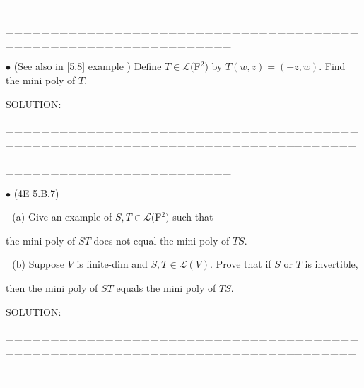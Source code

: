 \documentclass[a4paper, 11pt, UTF8]{article}
\def\Lm{\mathcal{L}}
\begin{document}
\begin{large}
\par
{\tiny \_\,\_\,\_\,\_\,\_\,\_\,\_\,\_\,\_\,\_\,\_\,\_\,\_\,\_\,\_\,\_\,\_\,\_\,\_\,\_\,\_\,\_\,\_\,\_\,\_\,\_\,\_\,\_\,\_\,\_\,\_\,\_\,\_\,\_\,\_\,\_\,\_\,\_\,\_\,\_\,\_\,\_\,\_\,\_\,\_\,\_\,\_\,\_\,\_\,\_\,\_\,\_\,\_\,\_\,\_\,\_\,\_\,\_\,\_\,\_\,\_\,\_\,\_\,\_\,\_\,\_\,\_\,\_\,\_\,\_\,\_\_\,\_\,\_\,\_\,\_\,\_\,\_\,\_\,\_\,\_\,\_\,\_\,\_\,\_\,\_\,\_\,\_\,\_\,\_\,\_\,\_\,\_\,\_\,\_\,\_\,\_\,\_\,\_\,\_\,\_\,\_\,\_\,\_\,\_\,\_\,\_\,\_\,\_\,\_\,\_\,\_\,\_\,\_\,\_\,\_\,\_\,\_\,\_\,\_\,\_\,\_\,\_\,\_\,\_\,\_\,\_\,\_\,\_\,\_\,\_\,\_\,\_\,\_\,\_\,\_\,\_\,\_\,\_\,\_\,\_\,\_}\par

{\small $\bullet$} (See also in [5.8] example ) {\timessl\Large 
Define $T\in\Lm(${\timesbf F}$^2)$ by $T(w, z) = (-z, w)$. Find the mini poly of $T$.
}\par
{\timesbf S\footnotesize{OLUTION:}}\par\quad

\par
{\tiny \_\,\_\,\_\,\_\,\_\,\_\,\_\,\_\,\_\,\_\,\_\,\_\,\_\,\_\,\_\,\_\,\_\,\_\,\_\,\_\,\_\,\_\,\_\,\_\,\_\,\_\,\_\,\_\,\_\,\_\,\_\,\_\,\_\,\_\,\_\,\_\,\_\,\_\,\_\,\_\,\_\,\_\,\_\,\_\,\_\,\_\,\_\,\_\,\_\,\_\,\_\,\_\,\_\,\_\,\_\,\_\,\_\,\_\,\_\,\_\,\_\,\_\,\_\,\_\,\_\,\_\,\_\,\_\,\_\,\_\,\_\_\,\_\,\_\,\_\,\_\,\_\,\_\,\_\,\_\,\_\,\_\,\_\,\_\,\_\,\_\,\_\,\_\,\_\,\_\,\_\,\_\,\_\,\_\,\_\,\_\,\_\,\_\,\_\,\_\,\_\,\_\,\_\,\_\,\_\,\_\,\_\,\_\,\_\,\_\,\_\,\_\,\_\,\_\,\_\,\_\,\_\,\_\,\_\,\_\,\_\,\_\,\_\,\_\,\_\,\_\,\_\,\_\,\_\,\_\,\_\,\_\,\_\,\_\,\_\,\_\,\_\,\_\,\_\,\_\,\_\,\_}\par


{\small $\bullet$} (\normalsize{4E 5.B.7})\par\,\,
(a) {\timessl\Large Give an example of $S, T\in\Lm(${\timesbf F}$^2)$ such that}\par\qquad
{\timessl\Large the mini poly of
$ST$ does not equal the mini poly of $TS$.}\par\,\,
(b) {\timessl\Large Suppose $V$ is finite-dim and $S, T\in\Lm(V)$. Prove that if $S$ or $T$ is invertible,}\par\qquad
{\timessl\Large then the mini poly of $ST$ equals the mini poly of $TS$.
}\par
{\timesbf S\footnotesize{OLUTION:}}\par\quad

\par
{\tiny \_\,\_\,\_\,\_\,\_\,\_\,\_\,\_\,\_\,\_\,\_\,\_\,\_\,\_\,\_\,\_\,\_\,\_\,\_\,\_\,\_\,\_\,\_\,\_\,\_\,\_\,\_\,\_\,\_\,\_\,\_\,\_\,\_\,\_\,\_\,\_\,\_\,\_\,\_\,\_\,\_\,\_\,\_\,\_\,\_\,\_\,\_\,\_\,\_\,\_\,\_\,\_\,\_\,\_\,\_\,\_\,\_\,\_\,\_\,\_\,\_\,\_\,\_\,\_\,\_\,\_\,\_\,\_\,\_\,\_\,\_\_\,\_\,\_\,\_\,\_\,\_\,\_\,\_\,\_\,\_\,\_\,\_\,\_\,\_\,\_\,\_\,\_\,\_\,\_\,\_\,\_\,\_\,\_\,\_\,\_\,\_\,\_\,\_\,\_\,\_\,\_\,\_\,\_\,\_\,\_\,\_\,\_\,\_\,\_\,\_\,\_\,\_\,\_\,\_\,\_\,\_\,\_\,\_\,\_\,\_\,\_\,\_\,\_\,\_\,\_\,\_\,\_\,\_\,\_\,\_\,\_\,\_\,\_\,\_\,\_\,\_\,\_\,\_\,\_\,\_\,\_}\par



\end{large}
\end{document}
